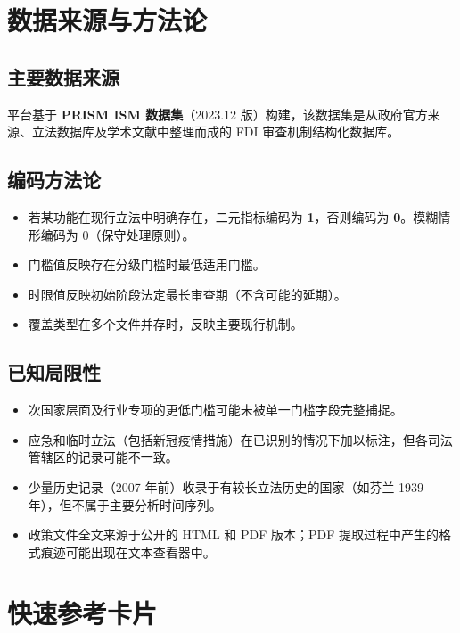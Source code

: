 \documentclass[12pt,a4paper]{article}
\begin{document}
\section{数据来源与方法论}
\label{sec:methodology}

\subsection{主要数据来源}

平台基于 \textbf{PRISM ISM 数据集}（2023.12 版）构建，该数据集是从政府官方来源、立法数据库及学术文献中整理而成的 FDI 审查机制结构化数据库。

\subsection{编码方法论}

\begin{itemize}
  \item 若某功能在现行立法中明确存在，二元指标编码为 \textbf{1}，否则编码为 \textbf{0}。模糊情形编码为 0（保守处理原则）。
  \item 门槛值反映存在分级门槛时最低适用门槛。
  \item 时限值反映初始阶段法定最长审查期（不含可能的延期）。
  \item 覆盖类型在多个文件并存时，反映主要现行机制。
\end{itemize}

\subsection{已知局限性}

\begin{itemize}
  \item 次国家层面及行业专项的更低门槛可能未被单一门槛字段完整捕捉。
  \item 应急和临时立法（包括新冠疫情措施）在已识别的情况下加以标注，但各司法管辖区的记录可能不一致。
  \item 少量历史记录（2007 年前）收录于有较长立法历史的国家（如芬兰 1939 年），但不属于主要分析时间序列。
  \item 政策文件全文来源于公开的 HTML 和 PDF 版本；PDF 提取过程中产生的格式痕迹可能出现在文本查看器中。
\end{itemize}

\section{快速参考卡片}
\label{sec:quickref}
\end{document}
